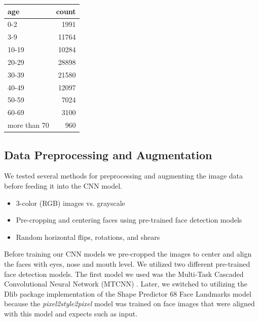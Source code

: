 \documentclass[11pt, letterpaper]{article}
\newenvironment{Figure}
  {\par\medskip\noindent\minipage{\linewidth}}
  {\endminipage\par\medskip}
\providecommand{\tightlist}{%
  \setlength{\itemsep}{0pt}\setlength{\parskip}{0pt}
}
\begin{document}
\begin{multicols}{2}
  \begin{Figure}
    \label{ages}
  \begin{tabular}{lr}
    \toprule
        age          &  count \\
        \midrule
        0-2          &   1991 \\
        3-9          &  11764 \\
        10-19        &  10284 \\
        20-29        &  28898 \\
        30-39        &  21580 \\
        40-49        &  12097 \\
        50-59        &   7024 \\
        60-69        &   3100 \\
        more than 70 &    960 \\
        \bottomrule
  \end{tabular}
  \end{Figure}

  \subsection{Data Preprocessing and Augmentation}

  We tested several methods for preprocessing and augmenting the image data
  before feeding it into the CNN model.

  \begin{itemize}
    \tightlist
  \item 3-color (RGB) images vs. grayscale
  \item Pre-cropping and centering faces using pre-trained face
    detection models
  \item Random horizontal flips, rotations, and shears
  \end{itemize}

  Before training our CNN models we pre-cropped the images to center
  and align the faces with eyes, nose and mouth level. We utilized two
  different pre-trained face detection models. The first model we used
  was the Multi-Task Cascaded Convolutional Neural Network (MTCNN)
  \cite{Zhang_2016}. Later, we switched to utilizing the Dlib package
  implementation of the Shape Predictor 68 Face Landmarks model
  \cite{SAGONAS20163} because the \emph{pixel2style2pixel} model was
  trained on face images that were aligned with this model and expects
  such as input.


\end{multicols}
\end{document}
